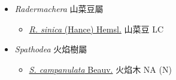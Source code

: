 
  \begin{itemize}
 \item[] \textit{Radermachera} 山菜豆屬
                                
  \begin{itemize}
        \item[] \href{http://www.theplantlist.org/tpl1.1/search?q=Radermachera+sinica}{\textit{R. sinica} (Hance) Hemsl.}   山菜豆   LC
  \end{itemize}
 \item[] \textit{Spathodea} 火焰樹屬
                                
  \begin{itemize}
        \item[] \href{http://www.theplantlist.org/tpl1.1/search?q=Spathodea+campanulata}{\textit{S. campanulata} Beauv.}   火焰木   NA (N)
  \end{itemize}
  \end{itemize}
